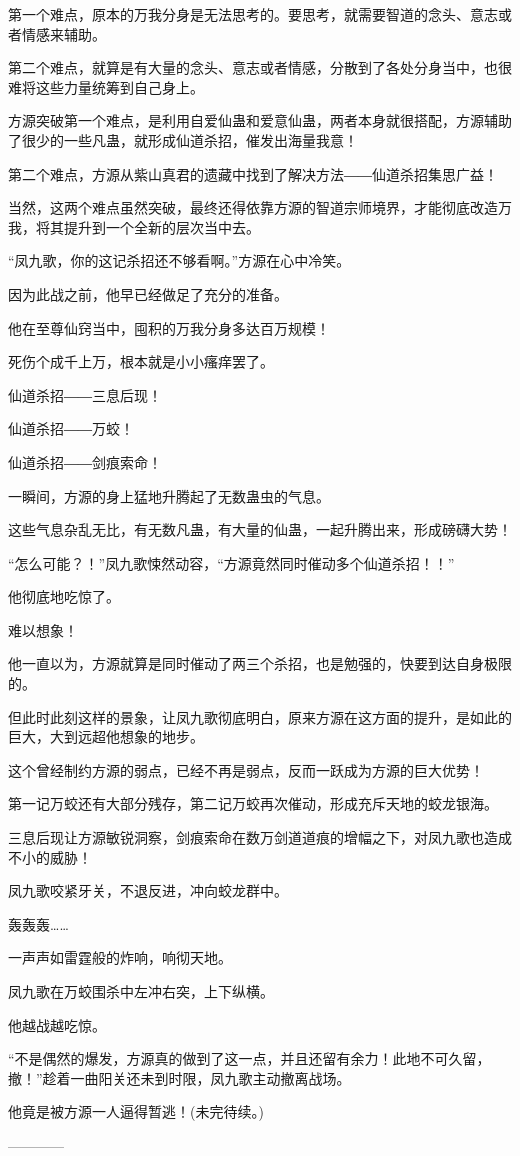 \begin{this_body}
第一个难点，原本的万我分身是无法思考的。要思考，就需要智道的念头、意志或者情感来辅助。

第二个难点，就算是有大量的念头、意志或者情感，分散到了各处分身当中，也很难将这些力量统筹到自己身上。

方源突破第一个难点，是利用自爱仙蛊和爱意仙蛊，两者本身就很搭配，方源辅助了很少的一些凡蛊，就形成仙道杀招，催发出海量我意！

第二个难点，方源从紫山真君的遗藏中找到了解决方法――仙道杀招集思广益！

当然，这两个难点虽然突破，最终还得依靠方源的智道宗师境界，才能彻底改造万我，将其提升到一个全新的层次当中去。

“凤九歌，你的这记杀招还不够看啊。”方源在心中冷笑。

因为此战之前，他早已经做足了充分的准备。

他在至尊仙窍当中，囤积的万我分身多达百万规模！

死伤个成千上万，根本就是小小瘙痒罢了。

仙道杀招――三息后现！

仙道杀招――万蛟！

仙道杀招――剑痕索命！

一瞬间，方源的身上猛地升腾起了无数蛊虫的气息。

这些气息杂乱无比，有无数凡蛊，有大量的仙蛊，一起升腾出来，形成磅礴大势！

“怎么可能？！”凤九歌悚然动容，“方源竟然同时催动多个仙道杀招！！”

他彻底地吃惊了。

难以想象！

他一直以为，方源就算是同时催动了两三个杀招，也是勉强的，快要到达自身极限的。

但此时此刻这样的景象，让凤九歌彻底明白，原来方源在这方面的提升，是如此的巨大，大到远超他想象的地步。

这个曾经制约方源的弱点，已经不再是弱点，反而一跃成为方源的巨大优势！

第一记万蛟还有大部分残存，第二记万蛟再次催动，形成充斥天地的蛟龙银海。

三息后现让方源敏锐洞察，剑痕索命在数万剑道道痕的增幅之下，对凤九歌也造成不小的威胁！

凤九歌咬紧牙关，不退反进，冲向蛟龙群中。

轰轰轰……

一声声如雷霆般的炸响，响彻天地。

凤九歌在万蛟围杀中左冲右突，上下纵横。

他越战越吃惊。

“不是偶然的爆发，方源真的做到了这一点，并且还留有余力！此地不可久留，撤！”趁着一曲阳关还未到时限，凤九歌主动撤离战场。

他竟是被方源一人逼得暂逃！(未完待续。)

------------

\end{this_body}

